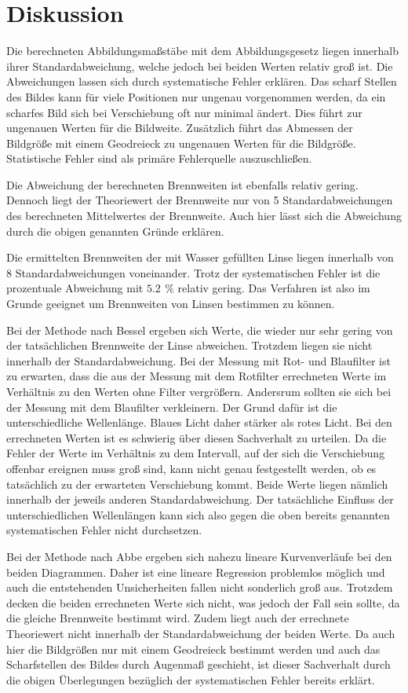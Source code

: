 \section{Diskussion}
\label{sec:Diskussion}
Die berechneten Abbildungsmaßstäbe mit dem Abbildungsgesetz liegen innerhalb ihrer Standardabweichung, welche
jedoch bei beiden Werten relativ groß ist. Die Abweichungen lassen sich durch systematische Fehler erklären.
Das scharf Stellen des Bildes kann für viele Positionen nur ungenau vorgenommen werden, da ein
scharfes Bild sich bei Verschiebung oft nur minimal ändert. Dies führt zur ungenauen Werten für die Bildweite.
Zusätzlich führt das Abmessen der Bildgröße mit einem Geodreieck zu ungenauen Werten für die Bildgröße.
Statistische Fehler sind als primäre Fehlerquelle auszuschließen.

Die Abweichung der berechneten Brennweiten ist ebenfalls relativ gering. Dennoch liegt der
Theoriewert der Brennweite nur von 5 Standardabweichungen des berechneten Mittelwertes der Brennweite. Auch hier lässt
sich die Abweichung durch die obigen genannten Gründe erklären.

Die ermittelten Brennweiten der mit Wasser gefüllten Linse liegen innerhalb von 8 Standardabweichungen voneinander.
Trotz der systematischen Fehler ist die prozentuale Abweichung mit $\SI{5.2}{} \, \%$ relativ gering. %
Das Verfahren ist also im Grunde geeignet um Brennweiten von Linsen bestimmen zu können.


Bei der Methode nach Bessel ergeben sich Werte, die wieder nur sehr gering von der tatsächlichen Brennweite der
Linse abweichen. Trotzdem liegen sie nicht innerhalb der Standardabweichung.
Bei der Messung mit Rot- und Blaufilter ist zu erwarten, dass die aus der Messung mit dem Rotfilter errechneten Werte
im Verhältnis zu den Werten ohne Filter vergrößern. Andersrum sollten sie sich bei der Messung mit dem Blaufilter verkleinern.
Der Grund dafür ist die unterschiedliche Wellenlänge. Blaues Licht daher stärker als rotes Licht. Bei den errechneten Werten
ist es schwierig über diesen Sachverhalt zu urteilen. Da die Fehler der Werte im Verhältnis zu dem Intervall, auf der sich
die Verschiebung offenbar ereignen muss groß sind, kann nicht genau festgestellt werden, ob es tatsächlich zu der erwarteten
Verschiebung kommt. Beide Werte liegen nämlich innerhalb der jeweils anderen Standardabweichung. Der tatsächliche Einfluss der unterschiedlichen Wellenlängen
kann sich also gegen die oben bereits genannten systematischen Fehler nicht durchsetzen.

Bei der Methode nach Abbe ergeben sich nahezu lineare Kurvenverläufe bei den beiden Diagrammen. Daher ist eine
lineare Regression problemlos möglich und auch die entstehenden Unsicherheiten fallen nicht sonderlich groß aus.
Trotzdem decken die beiden errechneten Werte sich nicht, was jedoch der Fall sein sollte, da die gleiche Brennweite
bestimmt wird. Zudem liegt auch der errechnete Theoriewert nicht innerhalb der Standardabweichung der beiden Werte.
Da auch hier die Bildgrößen nur mit einem Geodreieck bestimmt werden und auch das Scharfstellen des Bildes
durch Augenmaß geschieht, ist dieser Sachverhalt durch die obigen Überlegungen bezüglich der systematischen Fehler
bereits erklärt.
